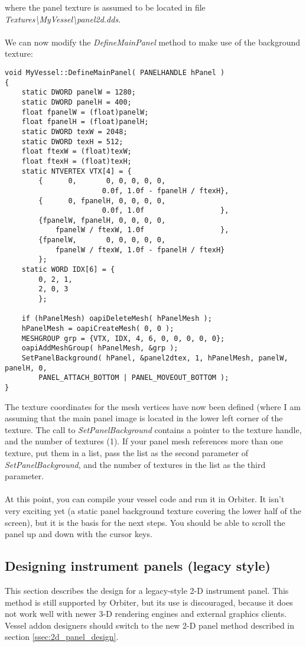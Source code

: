 \documentclass[Orbiter Developer Manual.tex]{subfiles}
\begin{document}
\noindent
where the panel texture is assumed to be located in file \textit{Textures\textbackslash MyVessel\textbackslash panel2d.dds}.\\
\\
We can now modify the \textit{DefineMainPanel} method to make use of the background texture:

\begin{lstlisting}
void MyVessel::DefineMainPanel( PANELHANDLE hPanel )
{
	static DWORD panelW = 1280;
	static DWORD panelH = 400;
	float fpanelW = (float)panelW;
	float fpanelH = (float)panelH;
	static DWORD texW = 2048;
	static DWORD texH = 512;
	float ftexW = (float)texW;
	float ftexH = (float)texH;
	static NTVERTEX VTX[4] = {
		{      0,       0, 0, 0, 0, 0,
			           0.0f, 1.0f - fpanelH / ftexH},
		{      0, fpanelH, 0, 0, 0, 0,
			           0.0f, 1.0f                  },
		{fpanelW, fpanelH, 0, 0, 0, 0,
			fpanelW / ftexW, 1.0f                  },
		{fpanelW,       0, 0, 0, 0, 0,
			fpanelW / ftexW, 1.0f - fpanelH / ftexH}
		};
	static WORD IDX[6] = {
		0, 2, 1,
		2, 0, 3
		};

	if (hPanelMesh) oapiDeleteMesh( hPanelMesh );
	hPanelMesh = oapiCreateMesh( 0, 0 );
	MESHGROUP grp = {VTX, IDX, 4, 6, 0, 0, 0, 0, 0};
	oapiAddMeshGroup( hPanelMesh, &grp );
	SetPanelBackground( hPanel, &panel2dtex, 1, hPanelMesh, panelW, panelH, 0,
		PANEL_ATTACH_BOTTOM | PANEL_MOVEOUT_BOTTOM );
}
\end{lstlisting}

\noindent
The texture coordinates for the mesh vertices have now been defined (where I am assuming that the main panel image is located in the lower left corner of the texture. The call to \textit{SetPanelBackground} contains a pointer to the texture handle, and the number of textures (1). If your panel mesh references more than one texture, put them in a list, pass the list as the second parameter of \textit{SetPanelBackground}, and the number of textures in the list as the third parameter.\\
\\
At this point, you can compile your vessel code and run it in Orbiter. It isn’t very exciting yet (a static panel background texture covering the lower half of the screen), but it is the basis for the next steps. You should be able to scroll the panel up and down with the cursor keys.


\subsection{Designing instrument panels (legacy style)}
This section describes the design for a legacy-style 2-D instrument panel. This method is still supported by Orbiter, but its use is discouraged, because it does not work well with newer 3-D rendering engines and external graphics clients. Vessel addon designers should switch to the new 2-D panel method described in section \ref{ssec:2d_panel_design}.
\end{document}

